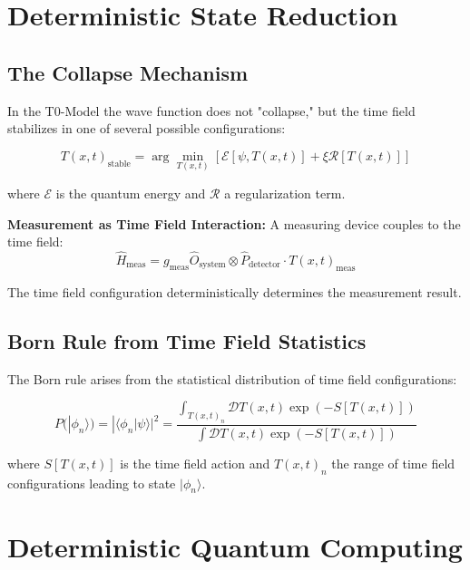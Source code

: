 \documentclass[12pt,a4paper]{report}
\newcommand{\Tfield}{T(x,t)}  %
\newcommand{\xipar}{\xi}      %
\begin{document}
	\section{Deterministic State Reduction}\label{sec:deterministic_state_reduction}
	
	\subsection{The Collapse Mechanism}\label{subsec:collapse_mechanism}
	
	In the T0-Model the wave function does not "collapse," but the time field stabilizes in one of several possible configurations:
	
	\begin{equation}\label{eq:timefield_stabilization}
		\Tfield_{\text{stable}} = \arg\min_{\Tfield} \left[\mathcal{E}[\psi, \Tfield] + \xipar \mathcal{R}[\Tfield]\right]
	\end{equation}
	
	where $\mathcal{E}$ is the quantum energy and $\mathcal{R}$ a regularization term.
	
	\textbf{Measurement as Time Field Interaction:}
	A measuring device couples to the time field:
	\begin{equation}
		\hat{H}_{\text{meas}} = g_{\text{meas}} \hat{O}_{\text{system}} \otimes \hat{P}_{\text{detector}} \cdot \Tfield_{\text{meas}}
	\end{equation}
	
	The time field configuration deterministically determines the measurement result.
	
	\subsection{Born Rule from Time Field Statistics}\label{subsec:born_rule}
	
	The Born rule arises from the statistical distribution of time field configurations:
	
	\begin{equation}\label{eq:born_rule_t0}
		P(|\phi_n\rangle) = |\langle \phi_n | \psi \rangle|^2 = \frac{\int_{\Tfield_n} \mathcal{D}\Tfield \exp(-S[\Tfield])}{\int \mathcal{D}\Tfield \exp(-S[\Tfield])}
	\end{equation}
	
	where $S[\Tfield]$ is the time field action and $\Tfield_n$ the range of time field configurations leading to state $|\phi_n\rangle$.
	
	\section{Deterministic Quantum Computing}\label{sec:deterministic_quantum_computing}
	
\end{document}
